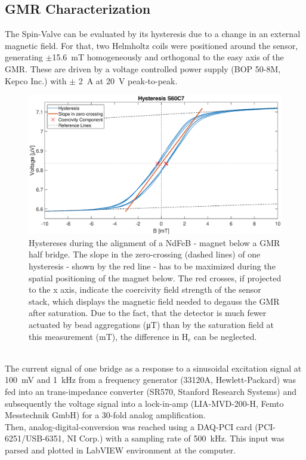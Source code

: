 \subsection*{GMR Characterization}
The Spin-Valve can be evaluated by its hysteresis due to a change in an external magnetic field. For that, two Helmholtz coils were positioned around the sensor, generating $\pm$\SI{15.6}{\milli\tesla} homogeneously and orthogonal to the easy axis of the GMR. These are driven by a voltage controlled power supply (BOP 50-8M, Kepco Inc.) with $\pm$ \SI{2}{\ampere} at \SI{20}{\volt} peak-to-peak.
\begin{figure}[!h]
	\includegraphics[scale=.49, trim=90 0 0 0]{Ressourcen/IMG/Hysteresis_plot_S60C7}
		\centering
	\caption{Hystereses during the alignment of a NdFeB - magnet below a GMR half bridge. The slope in the zero-crossing (dashed lines) of one hysteresis - shown by the red line - has to be maximized during the spatial positioning of the magnet below. The red crosses, if projected to the x axis, indicate the coercivity field strength of the sensor stack, which displays the magnetic field needed to degauss the GMR after saturation. Due to the fact, that the detector is much fewer actuated by bead aggregations (\si{\micro\tesla}) than by the saturation field at this measurement (\si{\milli\tesla}), the difference in H$_c$ can be neglected.}
	\label{fig:hysteresis}
\end{figure}
\\The current signal of one bridge as a response to a sinusoidal excitation signal at \SI{100}{\milli\volt} and \SI{1}{\kHz} from a frequency generator (33120A, Hewlett-Packard) was fed into an trans-impedance converter (SR570, Stanford Research Systems) and subsequently the voltage signal into a lock-in-amp (LIA-MVD-200-H, Femto Messtechnik GmbH) for a 30-fold analog amplification. \\Then, analog-digital-conversion was reached using a DAQ-PCI card (PCI-6251/USB-6351, NI Corp.) with a sampling rate of \SI{500}{\kHz}. This input was parsed and plotted in LabVIEW environment at the computer.
